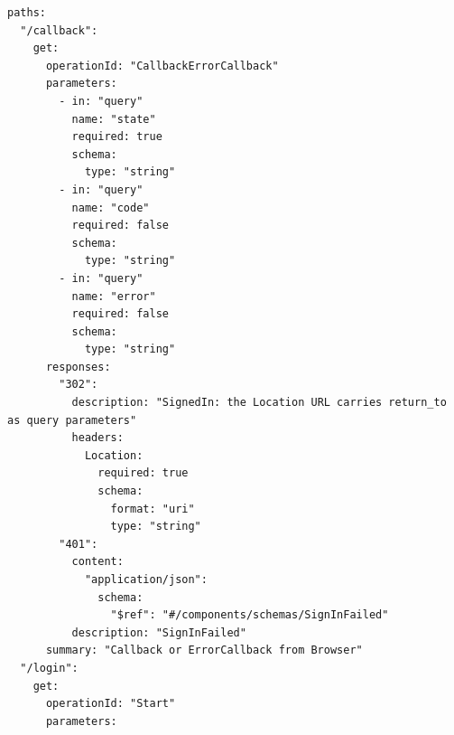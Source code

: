 \begin{lstlisting}[language={},basicstyle=\ttfamily\scriptsize,breaklines=true]
paths:
  "/callback":
    get:
      operationId: "CallbackErrorCallback"
      parameters:
        - in: "query"
          name: "state"
          required: true
          schema:
            type: "string"
        - in: "query"
          name: "code"
          required: false
          schema:
            type: "string"
        - in: "query"
          name: "error"
          required: false
          schema:
            type: "string"
      responses:
        "302":
          description: "SignedIn: the Location URL carries return_to as query parameters"
          headers:
            Location:
              required: true
              schema:
                format: "uri"
                type: "string"
        "401":
          content:
            "application/json":
              schema:
                "$ref": "#/components/schemas/SignInFailed"
          description: "SignInFailed"
      summary: "Callback or ErrorCallback from Browser"
  "/login":
    get:
      operationId: "Start"
      parameters:
\end{lstlisting}
